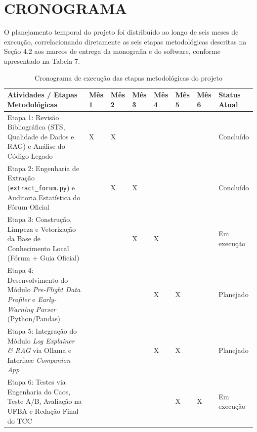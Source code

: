 \documentclass[
	oneside,
	a4paper,
	12pt,
	chapter=TITLE,
	section=TITLE,
	english,
	brazilian
]{abntex2}
\begin{document}
\FloatBarrier
\section{CRONOGRAMA}\label{sec:cronograma}


O planejamento temporal do projeto foi distribuído ao longo de seis meses de execução, correlacionando diretamente as seis etapas metodológicas descritas na Seção 4.2 aos marcos de entrega da monografia e do software, conforme apresentado na Tabela 7.

\begin{table}[htb]
  \caption{Cronograma de execução das etapas metodológicas do projeto}
  \label{tab:tabela_7}
  \centering
  \footnotesize
  \setlength{\tabcolsep}{2.5pt}
  \begin{tabularx}{\textwidth}{|>{\raggedright\arraybackslash}X|>{\centering\arraybackslash}p{0.75cm}|>{\centering\arraybackslash}p{0.75cm}|>{\centering\arraybackslash}p{0.75cm}|>{\centering\arraybackslash}p{0.75cm}|>{\centering\arraybackslash}p{0.75cm}|>{\centering\arraybackslash}p{0.75cm}|>{\centering\arraybackslash}p{2.0cm}|}
    \hline
    \textbf{Atividades / Etapas Metodológicas} & \textbf{Mês 1} & \textbf{Mês 2} & \textbf{Mês 3} & \textbf{Mês 4} & \textbf{Mês 5} & \textbf{Mês 6} & \textbf{Status Atual} \\ \hline
    Etapa 1: Revisão Bibliográfica (STS, Qualidade de Dados e RAG) e Análise do Código Legado & X & X &  &  &  &  & Concluído \\ \hline
    Etapa 2: Engenharia de Extração (\texttt{extract\_\allowbreak forum.\allowbreak py}) e Auditoria Estatística do Fórum Oficial &  & X & X &  &  &  & Concluído \\ \hline
    Etapa 3: Construção, Limpeza e Vetorização da Base de Conhecimento Local (Fórum + Guia Oficial) &  &  & X & X &  &  & Em execução \\ \hline
    Etapa 4: Desenvolvimento do Módulo \textit{Pre-Flight Data Profiler} e \textit{Early-Warning Parser} (Python/Pandas) &  &  &  & X & X &  & Planejado \\ \hline
    Etapa 5: Integração do Módulo \textit{Log Explainer \& RAG} via Ollama e Interface \textit{Companion App} &  &  &  & X & X &  & Planejado \\ \hline
    Etapa 6: Testes via Engenharia do Caos, Teste A/B, Avaliação na UFBA e Redação Final do TCC &  &  &  &  & X & X & Em execução \\ \hline
  \end{tabularx}
\end{table}
\FloatBarrier
\end{document}
